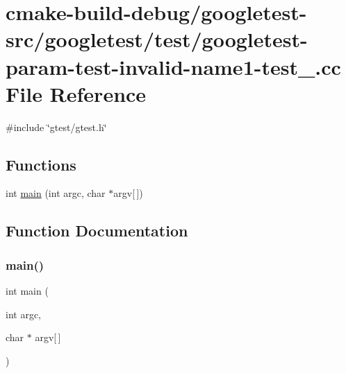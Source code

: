 \hypertarget{googletest-param-test-invalid-name1-test___8cc}{}\section{cmake-\/build-\/debug/googletest-\/src/googletest/test/googletest-\/param-\/test-\/invalid-\/name1-\/test\+\_\+.cc File Reference}
\label{googletest-param-test-invalid-name1-test___8cc}
{\ttfamily \#include \char`\"{}gtest/gtest.\+h\char`\"{}}\newline
\subsection*{Functions}
\begin{DoxyCompactItemize}
\item 
int \mbox{\hyperlink{googletest-param-test-invalid-name1-test___8cc_a0ddf1224851353fc92bfbff6f499fa97}{main}} (int argc, char $\ast$argv\mbox{[}$\,$\mbox{]})
\end{DoxyCompactItemize}


\subsection{Function Documentation}
\mbox{\label{googletest-param-test-invalid-name1-test___8cc_a0ddf1224851353fc92bfbff6f499fa97}} 
\subsubsection{\texorpdfstring{main()}{main()}}
{\footnotesize\ttfamily int main (\begin{DoxyParamCaption}\item[{int}]{argc,  }\item[{char $\ast$}]{argv\mbox{[}$\,$\mbox{]} }\end{DoxyParamCaption})}


